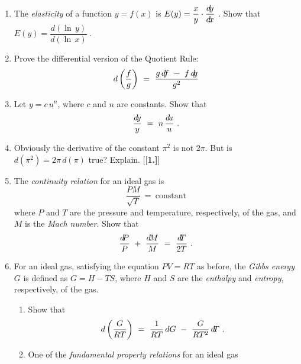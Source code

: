 \startexercises\label{sec3dot6}
{\small
{}
\begin{enumerate}[\bfseries 1.]
 \item The \emph{elasticity} of a function $y = f(x)$ is
 $E(y) = \dfrac{x}{y} \cdot \dfrac{d\!y}{d\!x}~$. Show that $E(y) = \dfrac{d(\ln\,y)}{d(\ln\,x)}~$.
 \item Prove the differential version of the Quotient Rule:
 \[
  d\left(\dfrac{f}{g}\right) ~=~ \dfrac{g\,d\negmedspace f ~-~ f\,d\negmedspace g}{g^2}
 \]
\newpage
 \item Let $y = c\,u^n$, where $c$ and $n$ are constants. Show that
 \[
  \frac{d\!y}{y} ~=~ n\,\frac{d\!u}{u} ~.
 \]
 \item Obviously the derivative of the constant $\pi^2$ is not $2\pi$. But is
  $d(\pi^2) = 2\pi\,d(\pi)$ true? Explain.
[{[\bfseries 1.]}]
 \item The \emph{continuity relation} for an ideal gas is
 \[
 \frac{PM}{\sqrt{T}} ~=~ \text{constant}
 \]
 where $P$ and $T$ are the pressure and temperature, respectively, of the gas,
 and $M$ is the \emph{Mach number}. Show that
 \[
 \frac{d\negmedspace P}{P} ~+~ \frac{d\!M}{M} ~=~ \frac{d\negmedspace T}{2T} ~.
 \]
 \item For an ideal gas, satisfying the equation $PV = RT$ as before, the \emph{Gibbs
  energy} $G$ is defined as $G = H - TS$, where $H$ and $S$ are
  the \emph{enthalpy} and \emph{entropy}, respectively, of the gas.
  \begin{enumerate}[\bfseries (a)]
   \item Show that
   \begin{displaymath}
    d\left(\dfrac{G}{RT}\right) ~=~ \dfrac{1}{RT}\,dG ~-~ \dfrac{G}{RT^2}\,d\negmedspace T ~.
   \end{displaymath}
   \item One of the \emph{fundamental property relations} for an ideal gas

\end{enumerate}
\end{enumerate}}
